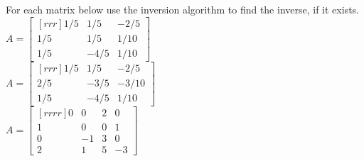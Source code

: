 \ii For each matrix below use the inversion algorithm to find the inverse, if it exists.
\vspace{.1in} \\
\bb
\ii $A=\begin{bmatrix}[rrr]
1/5&1/5&-2/5\\
1/5&1/5&1/10\\
1/5&-4/5&1/10\end{bmatrix}
$
\vspace{.1in} \\
\ii $A=\begin{bmatrix}[rrr]
1/5&1/5&-2/5\\
2/5&-3/5&-3/10\\
1/5&-4/5&1/10
\end{bmatrix}
$
\vspace{.1in} \\
\ii
$A=\begin{bmatrix}[rrrr]
0&0&2&0\\
1&0&0&1\\
0&-1&3&0\\
2&1&5&-3
\end{bmatrix}
$
\vspace{.1in} \\
\ee
